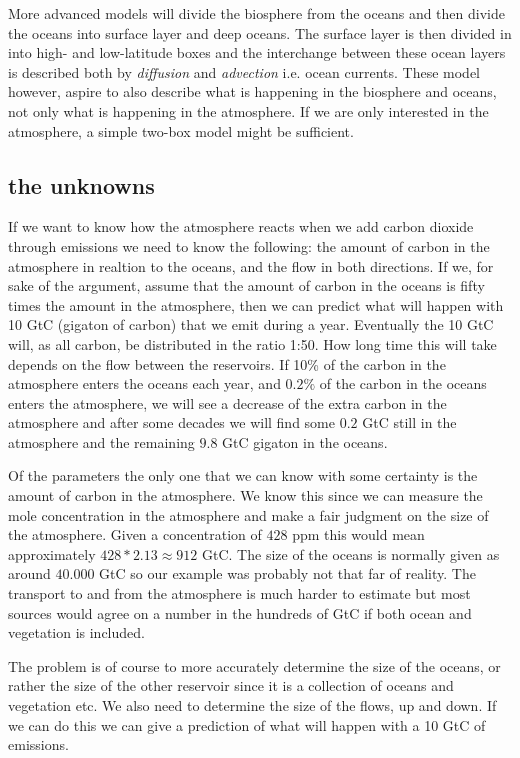 \documentclass[a4paper,11pt]{article}
\begin{document}
More advanced models will divide the biosphere from the oceans and
then divide the oceans into surface layer and deep oceans. The surface
layer is then divided in into high- and low-latitude boxes and the
interchange between these ocean layers is described both by {\em
  diffusion} and {\em advection} i.e. ocean currents. These model
however, aspire to also describe what is happening in the biosphere
and oceans, not only what is happening in the atmosphere. If we are
only interested in the atmosphere, a simple two-box model might be
sufficient.

\subsection*{the unknowns}

If we want to know how the atmosphere reacts when we add carbon
dioxide through emissions we need to know the following: the amount of
carbon in the atmosphere in realtion to the oceans, and the flow in
both directions. If we, for sake of the argument, assume that the
amount of carbon in the oceans is fifty times the amount in the
atmosphere, then we can predict what will happen with 10 GtC (gigaton of
carbon) that we emit during a year. Eventually the 10 GtC will, as
all carbon, be distributed in the ratio 1:50. How long time this will
take depends on the flow between the reservoirs. If 10\% of the carbon
in the atmosphere enters the oceans each year, and $0.2\%$ of the
carbon in the oceans enters the atmosphere, we will see a decrease of
the extra carbon in the atmosphere and after some decades we will find
some $0.2$ GtC still in the atmosphere and the remaining $9.8$ GtC
gigaton in the oceans.

Of the parameters the only one that we can know with some certainty is
the amount of carbon in the atmosphere. We know this since we can
measure the mole concentration in the atmosphere and make a fair
judgment on the size of the atmosphere. Given a concentration of $428$
ppm this would mean approximately $428 * 2.13 \approx 912$ GtC. The
size of the oceans is normally given as around $40.000$ GtC so our
example was probably not that far of reality. The transport to and
from the atmosphere is much harder to estimate but most sources would
agree on a number in the hundreds of GtC if both ocean and vegetation
is included.

The problem is of course to more accurately determine the size of the
oceans, or rather the size of the other reservoir since it is a
collection of oceans and vegetation etc. We also need to determine the
size of the flows, up and down. If we can do this we can give a
prediction of what will happen with a 10 GtC of emissions.
\end{document}
